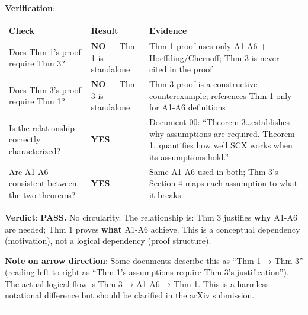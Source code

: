 \documentclass[
  12pt,
]{article}
\begin{document}
\textbf{Verification}:

\begin{longtable}[]{@{}
  >{\raggedright\arraybackslash}p{}
  >{\raggedright\arraybackslash}p{}
  >{\raggedright\arraybackslash}p{}@{}}
\toprule\noalign{}
\begin{minipage}[b]{\linewidth}\raggedright
Check
\end{minipage} & \begin{minipage}[b]{\linewidth}\raggedright
Result
\end{minipage} & \begin{minipage}[b]{\linewidth}\raggedright
Evidence
\end{minipage} \\
\midrule\noalign{}
\endhead
\bottomrule\noalign{}
\endlastfoot
Does Thm 1's proof require Thm 3? & \textbf{NO} --- Thm 1 is standalone
& Thm 1 proof uses only A1-A6 + Hoeffding/Chernoff; Thm 3 is never cited
in the proof \\
Does Thm 3's proof require Thm 1? & \textbf{NO} --- Thm 3 is standalone
& Thm 3 proof is a constructive counterexample; references Thm 1 only
for A1-A6 definitions \\
Is the relationship correctly characterized? & \textbf{YES} & Document
00: ``Theorem 3\ldots establishes why assumptions are required. Theorem
1\ldots quantifies how well SCX works when its assumptions hold.'' \\
Are A1-A6 consistent between the two theorems? & \textbf{YES} & Same
A1-A6 used in both; Thm 3's Section 4 maps each assumption to what it
breaks \\
\end{longtable}

\textbf{Verdict}: \textbf{PASS.} No circularity. The relationship is:
Thm 3 justifies \textbf{why} A1-A6 are needed; Thm 1 proves
\textbf{what} A1-A6 achieve. This is a conceptual dependency
(motivation), not a logical dependency (proof structure).

\textbf{Note on arrow direction}: Some documents describe this as ``Thm
1 → Thm 3'' (reading left-to-right as ``Thm 1's assumptions require Thm
3's justification''). The actual logical flow is Thm 3 → A1-A6 → Thm 1.
This is a harmless notational difference but should be clarified in the
arXiv submission.

\begin{center}\rule{0.5\linewidth}{0.5pt}\end{center}
\end{document}
